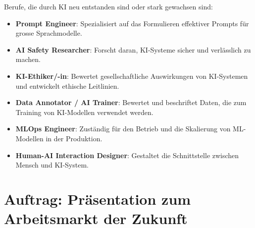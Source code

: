 \begin{myexample}
Berufe, die durch KI neu entstanden sind oder stark gewachsen sind:
\begin{itemize}
    \item \textbf{Prompt Engineer}: Spezialisiert auf das Formulieren effektiver
          Prompts für grosse Sprachmodelle.
    \item \textbf{AI Safety Researcher}: Forscht daran, KI-Systeme sicher und
          verlässlich zu machen.
    \item \textbf{KI-Ethiker/-in}: Bewertet gesellschaftliche Auswirkungen von
          KI-Systemen und entwickelt ethische Leitlinien.
    \item \textbf{Data Annotator / AI Trainer}: Bewertet und beschriftet Daten,
          die zum Training von KI-Modellen verwendet werden.
    \item \textbf{MLOps Engineer}: Zuständig für den Betrieb und die
          Skalierung von ML-Modellen in der Produktion.
    \item \textbf{Human-AI Interaction Designer}: Gestaltet die
          Schnittstelle zwischen Mensch und KI-System.
\end{itemize}
\end{myexample}

\section{Auftrag: Präsentation zum Arbeitsmarkt der Zukunft}

